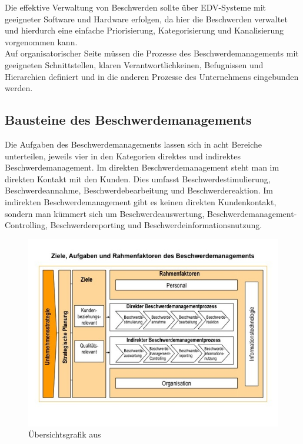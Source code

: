 \documentclass[a4paper,12pt]{article}
\begin{document}
	\noindent Die effektive Verwaltung von Beschwerden sollte über EDV-Systeme mit geeigneter Software und Hardware erfolgen, da hier die Beschwerden verwaltet und hierdurch eine einfache Priorisierung, Kategorisierung und Kanalisierung vorgenommen kann. \\
	
	\noindent Auf organisatorischer Seite müssen die Prozesse des Beschwerdemanagements mit geeigneten Schnittstellen, klaren Verantwortlichkeinen, Befugnissen und Hierarchien definiert und in die anderen Prozesse des Unternehmens eingebunden werden. \cite{Gabler}
	
	\subsection{Bausteine des Beschwerdemanagements}
	Die Aufgaben des Beschwerdemanagements lassen sich in acht Bereiche unterteilen, jeweils vier in den Kategorien direktes und indirektes Beschwerdemanagement. Im direkten Beschwerdemanagement steht man im direkten Kontakt mit den Kunden. Dies umfasst Beschwerdestimulierung, Beschwerdeannahme, Beschwerdebearbeitung und Beschwerdereaktion. Im indirekten Beschwerdemanagement gibt es keinen direkten Kundenkontakt, sondern man kümmert sich um Beschwerdeauswertung, Beschwerdemanagement-Controlling, Beschwerdereporting und Beschwerdeinformationsnutzung. \cite{Gabler}
	\begin{figure}[h]
		\begin{center}
			\includegraphics[width=\textwidth]{fig/gabler.jpg}
			\caption{Übersichtsgrafik aus \cite{Gabler}}
		\end{center}
	\end{figure}
\end{document}
